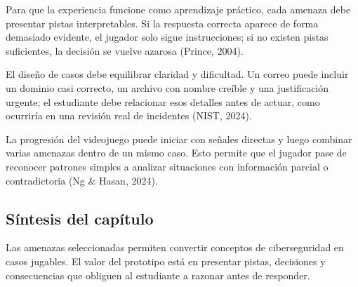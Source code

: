 Para que la experiencia funcione como aprendizaje pr\'{a}ctico, cada amenaza debe presentar pistas interpretables. Si la respuesta correcta aparece de forma demasiado evidente, el jugador solo sigue instrucciones; si no existen pistas suficientes, la decisi\'{o}n se vuelve azarosa (Prince, 2004).

El dise\~{n}o de casos debe equilibrar claridad y dificultad. Un correo puede incluir un dominio casi correcto, un archivo con nombre cre\'{i}ble y una justificaci\'{o}n urgente; el estudiante debe relacionar esos detalles antes de actuar, como ocurrir\'{i}a en una revisi\'{o}n real de incidentes (NIST, 2024).

La progresi\'{o}n del videojuego puede iniciar con se\~{n}ales directas y luego combinar varias amenazas dentro de un mismo caso. Esto permite que el jugador pase de reconocer patrones simples a analizar situaciones con informaci\'{o}n parcial o contradictoria (Ng \& Hasan, 2024).

\subsection{S\'{i}ntesis del cap\'{i}tulo}

Las amenazas seleccionadas permiten convertir conceptos de ciberseguridad en casos jugables. El valor del prototipo est\'{a} en presentar pistas, decisiones y consecuencias que obliguen al estudiante a razonar antes de responder.
